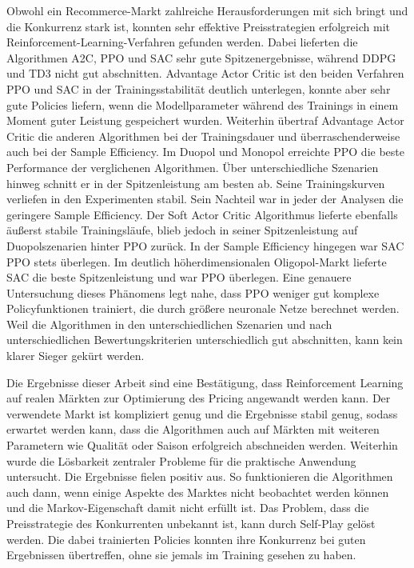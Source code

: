 Obwohl ein Recommerce-Markt zahlreiche Herausforderungen mit sich bringt und die Konkurrenz stark ist, konnten sehr effektive Preisstrategien erfolgreich mit Reinforcement-Learning-Verfahren gefunden werden.
Dabei lieferten die Algorithmen A2C, PPO und SAC sehr gute Spitzenergebnisse, während DDPG und TD3 nicht gut abschnitten.
Advantage Actor Critic ist den beiden Verfahren PPO und SAC in der Trainingsstabilität deutlich unterlegen, konnte aber sehr gute Policies liefern, wenn die Modellparameter während des Trainings in einem Moment guter Leistung gespeichert wurden.
Weiterhin übertraf Advantage Actor Critic die anderen Algorithmen bei der Trainingsdauer und überraschenderweise auch bei der Sample Efficiency.
Im Duopol und Monopol erreichte PPO die beste Performance der verglichenen Algorithmen.
Über unterschiedliche Szenarien hinweg schnitt er in der Spitzenleistung am besten ab.
Seine Trainingskurven verliefen in den Experimenten stabil.
Sein Nachteil war in jeder der Analysen die geringere Sample Efficiency.
Der Soft Actor Critic Algorithmus lieferte ebenfalls äußerst stabile Trainingsläufe, blieb jedoch in seiner Spitzenleistung auf Duopolszenarien hinter PPO zurück.
In der Sample Efficiency hingegen war SAC PPO stets überlegen.
Im deutlich höherdimensionalen Oligopol-Markt lieferte SAC die beste Spitzenleistung und war PPO überlegen.
Eine genauere Untersuchung dieses Phänomens legt nahe, dass PPO weniger gut komplexe Policyfunktionen trainiert, die durch größere neuronale Netze berechnet werden.
Weil die Algorithmen in den unterschiedlichen Szenarien und nach unterschiedlichen Bewertungskriterien unterschiedlich gut abschnitten, kann kein klarer Sieger gekürt werden.

Die Ergebnisse dieser Arbeit sind eine Bestätigung, dass Reinforcement Learning auf realen Märkten zur Optimierung des Pricing angewandt werden kann.
Der verwendete Markt ist kompliziert genug und die Ergebnisse stabil genug, sodass erwartet werden kann, dass die Algorithmen auch auf Märkten mit weiteren Parametern wie Qualität oder Saison erfolgreich abschneiden werden.
Weiterhin wurde die Lösbarkeit zentraler Probleme für die praktische Anwendung untersucht.
Die Ergebnisse fielen positiv aus.
So funktionieren die Algorithmen auch dann, wenn einige Aspekte des Marktes nicht beobachtet werden können und die Markov-Eigenschaft damit nicht erfüllt ist.
Das Problem, dass die Preisstrategie des Konkurrenten unbekannt ist, kann durch Self-Play gelöst werden.
Die dabei trainierten Policies konnten ihre Konkurrenz bei guten Ergebnissen übertreffen, ohne sie jemals im Training gesehen zu haben.

